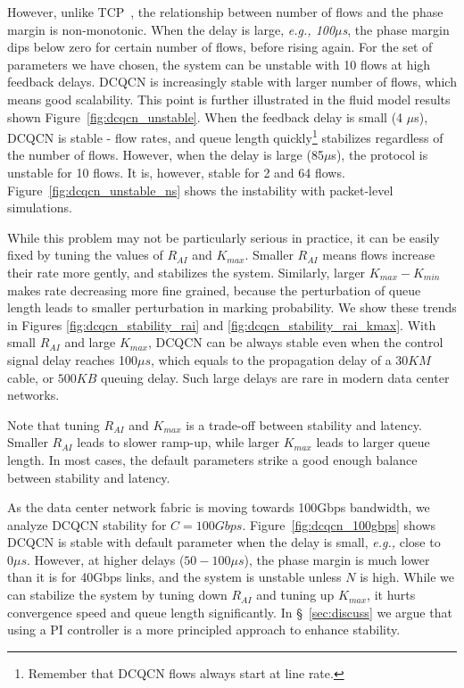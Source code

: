 However, unlike TCP~\cite{misra2000fluid}, the relationship between number of
flows and the phase margin is non-monotonic. When the delay is large, {\em e.g.,
100$\mu$s}, the phase margin dips below zero for certain number of flows, before
rising again.  For the set of parameters we have chosen, the system can be
unstable with 10 flows at high feedback delays.  DCQCN is increasingly stable
with larger number of flows, which means good scalability. This point is further
illustrated in the fluid model results shown Figure~\ref{fig:dcqcn_unstable}.
When the feedback delay is small (4 $\mu$s), DCQCN is stable - flow rates, and
queue length quickly\footnote{Remember that DCQCN flows always start at line
rate.} stabilizes regardless of the number of flows. However, when the delay is
large (85$\mu$s), the protocol is unstable for 10 flows. It is, however, stable
for 2 and 64 flows. Figure~\ref{fig:dcqcn_unstable_ns} shows the instability
with packet-level simulations.

While this problem may not be particularly serious in practice, it can be easily
fixed by tuning the values of $R_{AI}$ and $K_{max}$.  Smaller $R_{AI}$ means
flows increase their rate more gently, and stabilizes the system.  Similarly,
larger $K_{max} - K_{min}$ makes rate decreasing more fine grained, because the
perturbation of queue length leads to smaller perturbation in marking
probability.  We show these trends in Figures \ref{fig:dcqcn_stability_rai} and
\ref{fig:dcqcn_stability_rai_kmax}.  With small $R_{AI}$ and large $K_{max}$,
DCQCN can be always stable even when the control signal delay reaches 100$\mu
s$, which equals to the propagation delay of a $30KM$ cable, or $500KB$ queuing
delay. Such large delays are rare in modern data center networks. 

Note that tuning $R_{AI}$ and $K_{max}$ is a trade-off between stability and
latency. Smaller $R_{AI}$ leads to slower ramp-up, while larger $K_{max}$ leads
to larger queue length. In most cases, the default parameters strike a good
enough balance between stability and latency.

  As the data center network fabric is moving towards
100Gbps bandwidth, we analyze DCQCN stability for $C=100Gbps$.
Figure~\ref{fig:dcqcn_100gbps} shows DCQCN is stable with default parameter when
the delay is small, {\em e.g.,} close to $0\mu s$. However, at higher delays
($50-100 \mu s$), the phase margin is much lower than it is for 40Gbps links, and
the system is unstable unless $N$ is high. While we can stabilize the system by
tuning down $R_{AI}$ and tuning up $K_{max}$, it hurts convergence speed and
queue length significantly. In \S~\ref{sec:discuss} we argue that using a PI
controller is a more principled approach to enhance stability.
\fi
